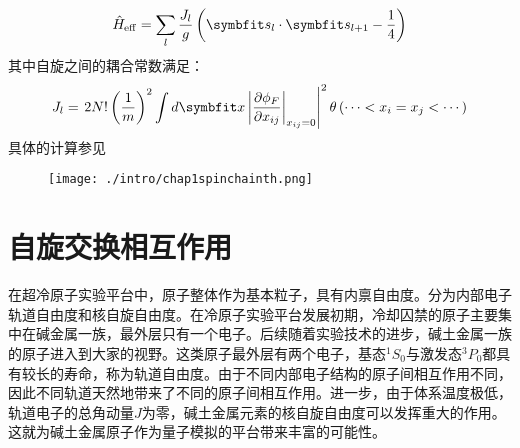 \begin{equation}
\hat{H}_{\mathrm{eff}}=\sum_{l} \frac{J_{l}}{g}\left(\Vector{s}_{l} \cdot \Vector{s}_{l+1}-\frac{1}{4}\right)
\end{equation}
其中自旋之间的耦合常数满足：
\begin{equation}
J_{l}=\left.2 N !\left(\frac{1}{m}\right)^{2} \int d \Vector{x}\left|\frac{\partial \phi_{F}}{\partial x_{i j}}\right|_{x_{i j}=0}\right|^{2} \theta\left(\cdots<x_{i}=x_{j}<\cdots\right)
\end{equation}
具体的计算参见\cite{Guan2009exact,Santos2014spinchain,Yang2016effective}
\begin{figure}[!htbp]
    \centering
    \texttt{[image: ./intro/chap1spinchainth.png]}
    \label{spinchainth}
\end{figure}
\begin{comment}
基于上面介绍的量子少体研究进展，将有几个可扩展的方向，比如改变相互作用，偶极、库伦、以及自旋交换相互作用，这其中自旋交换相互作用将是下一章节要重点介绍的。
\end{comment}











\section{自旋交换相互作用}\label{1sec:spin-exchange}
在超冷原子实验平台中，原子整体作为基本粒子，具有内禀自由度。分为内部电子轨道自由度和核自旋自由度。在冷原子实验平台发展初期，冷却囚禁的原子主要集中在碱金属一族，最外层只有一个电子。后续随着实验技术的进步，碱土金属一族的原子进入到大家的视野。这类原子最外层有两个电子，基态${}^1S_0$与激发态${}^3P_0$都具有较长的寿命，称为轨道自由度。由于不同内部电子结构的原子间相互作用不同，因此不同轨道天然地带来了不同的原子间相互作用。进一步，由于体系温度极低，轨道电子的总角动量$J$为零，碱土金属元素的核自旋自由度可以发挥重大的作用。这就为碱土金属原子作为量子模拟的平台带来丰富的可能性。

